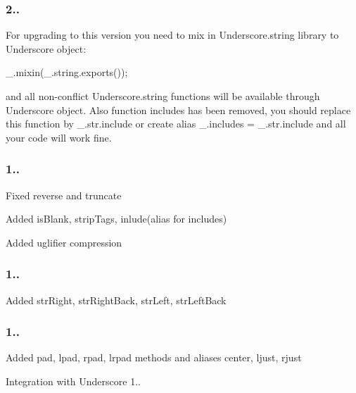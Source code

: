 \subsubsection*{2..}

For upgrading to this version you need to mix in Underscore.\+string library to Underscore object\+:


\begin{DoxyCode}
\_.mixin(\_.string.exports());
\end{DoxyCode}


and all non-\/conflict Underscore.\+string functions will be available through Underscore object. Also function {\ttfamily includes} has been removed, you should replace this function by {\ttfamily \+\_\+.\+str.\+include} or create alias {\ttfamily \+\_\+.\+includes = \+\_\+.\+str.\+include} and all your code will work fine.

\subsubsection*{1..}


\begin{DoxyItemize}
\item Fixed reverse and truncate
\item Added is\+Blank, strip\+Tags, inlude(alias for includes)
\item Added uglifier compression
\end{DoxyItemize}

\subsubsection*{1..}


\begin{DoxyItemize}
\item Added str\+Right, str\+Right\+Back, str\+Left, str\+Left\+Back
\end{DoxyItemize}

\subsubsection*{1..}


\begin{DoxyItemize}
\item Added pad, lpad, rpad, lrpad methods and aliases center, ljust, rjust
\item Integration with Underscore 1..
\end{DoxyItemize}

